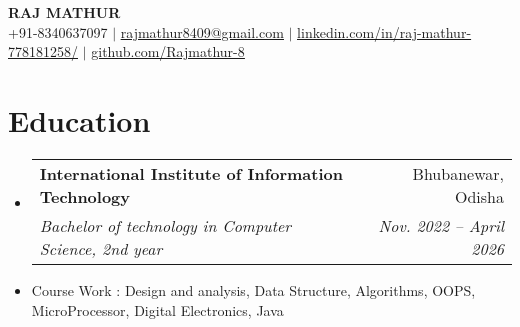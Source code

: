 \documentclass[letterpaper,11pt]{article}
\makeatletter
\newcommand{\resumeItem}[1]{
  \item\small{
    {#1 \vspace{-2pt}}
  }
}
\newcommand{\resumeSubheading}[4]{
  \vspace{-2pt}\item
    \begin{tabular*}{0.97\textwidth}[t]{l@{\extracolsep{\fill}}r}
      \textbf{#1} & #2 \\
      \textit{\small#3} & \textit{\small #4} \\
    \end{tabular*}\vspace{-7pt}
}
\newcommand{\resumeSubHeadingListStart}{\begin{itemize}[leftmargin=0.15in, label={}]}
\newcommand{\resumeSubHeadingListEnd}{\end{itemize}}
\newcommand{\resumeItemListStart}{\begin{itemize}}
\newcommand{\resumeItemListEnd}{\end{itemize}\vspace{-5pt}}
\makeatother
\begin{document}

\begin{center}
    \textbf{\Huge \scshape RAJ MATHUR} \\ \vspace{1pt}
    \small +91-8340637097 $|$ \href{mailto:x@x.com}{\underline{rajmathur8409@gmail.com}} $|$ 
    \href{https://linkedin.com/in/...}{\underline{linkedin.com/in/raj-mathur-778181258/}} $|$
    \href{https://github.com/...}{\underline{github.com/Rajmathur-8}}
\end{center}


\section{Education}
  \resumeSubHeadingListStart
    \resumeSubheading
      {International Institute of Information Technology}{Bhubanewar, Odisha}
      {Bachelor of technology in Computer Science, 2nd year}{Nov. 2022 -- April 2026}
      \resumeItem{Course Work : Design and analysis, Data Structure, Algorithms, OOPS, MicroProcessor, Digital Electronics, Java}
  \resumeSubHeadingListEnd


%
      
\end{document}

